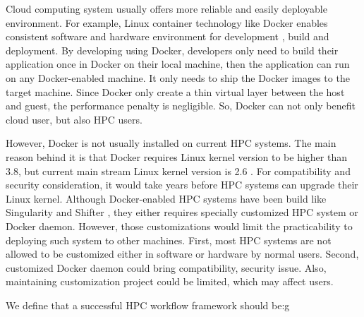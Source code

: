 Cloud computing system usually offers more reliable and easily deployable environment. For example, Linux container technology like Docker \cite{Docker} enables consistent software and hardware environment for development \cite{awscontainer}, build and deployment. By developing using Docker, developers only need to build their application once in Docker on their local machine, then the application can run on any Docker-enabled machine. It only needs to ship the Docker images to the target machine. Since Docker only create a thin virtual layer between the host and guest, the performance penalty is negligible. So, Docker can not only benefit cloud user, but also HPC  users. 

However, Docker is not usually installed on current HPC systems. The main reason behind it is that Docker requires Linux kernel version to be higher than 3.8, but current main stream Linux kernel version is 2.6 . For compatibility and security consideration, it would take years before HPC systems can upgrade their Linux kernel. Although Docker-enabled HPC systems have been build like Singularity \cite{kurtzer_2016_60736} and Shifter \cite{jacobsen2015contain}, they either requires specially customized HPC system or Docker daemon. However, those customizations would limit the practicability to deploying such system to other machines. First, most HPC systems are not allowed to be customized either in software or hardware by normal users. Second, customized Docker daemon could bring compatibility, security issue. Also, maintaining customization project could be limited, which may affect users.

\begin{comment}
\qguan{We may need to put some bullets to define what is needed for a successful workflow framework } \\
\qguan{For example  1. Automation  }\\
\qguan{2.Portability}\\
\qguan{3.Flexibility} \\
\qguan{4.Reproducibility}\\
\qguan{5.Interfacing Continuous Integration?}\\
\qguan{these requirements should be mapping to our contribution}
\end{comment}

We define that a successful HPC workflow framework should be:g


